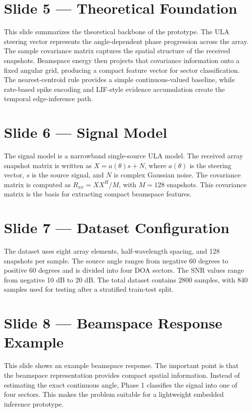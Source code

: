 \documentclass[11pt]{article}
\begin{document}
\section*{Slide 5 --- Theoretical Foundation}

This slide summarizes the theoretical backbone of the prototype. The ULA steering vector represents the angle-dependent phase progression across the array. The sample covariance matrix captures the spatial structure of the received snapshots. Beamspace energy then projects that covariance information onto a fixed angular grid, producing a compact feature vector for sector classification. The nearest-centroid rule provides a simple continuous-valued baseline, while rate-based spike encoding and LIF-style evidence accumulation create the temporal edge-inference path.

\section*{Slide 6 --- Signal Model}

The signal model is a narrowband single-source ULA model. The received array snapshot matrix is written as $X=a(\theta)s+N$, where $a(\theta)$ is the steering vector, $s$ is the source signal, and $N$ is complex Gaussian noise. The covariance matrix is computed as $R_{xx}=XX^H/M$, with $M=128$ snapshots. This covariance matrix is the basis for extracting compact beamspace features.

\section*{Slide 7 --- Dataset Configuration}

The dataset uses eight array elements, half-wavelength spacing, and 128 snapshots per sample. The source angle ranges from negative 60 degrees to positive 60 degrees and is divided into four DOA sectors. The SNR values range from negative 10 dB to 20 dB. The total dataset contains 2800 samples, with 840 samples used for testing after a stratified train-test split.

\section*{Slide 8 --- Beamspace Response Example}

This slide shows an example beamspace response. The important point is that the beamspace representation provides compact spatial information. Instead of estimating the exact continuous angle, Phase 1 classifies the signal into one of four sectors. This makes the problem suitable for a lightweight embedded inference prototype.
\end{document}
